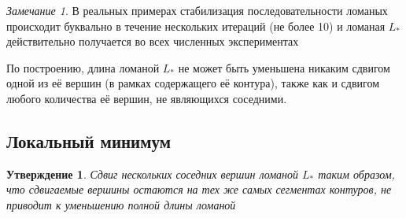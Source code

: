 \documentclass[14pt]{extarticle}
\theoremstyle{plain}%
\newtheorem{proposition}[theorem]{Утверждение}
\theoremstyle{remark}
\newtheorem{remark}{Замечание}
\begin{document}
\begin{remark}
  В реальных примерах
  стабилизация последовательности ломаных
  происходит буквально в течение
  нескольких итераций
  (не более 10)
  и ломаная
  $L_*$
  действительно получается
  во всех численных экспериментах
\end{remark}

По построению,
длина ломаной
$L_*$
не может быть уменьшена никаким сдвигом
одной из её вершин
(в рамках содержащего её контура),
также как и сдвигом
любого количества её вершин,
не являющихся соседними.

\subsection{Локальный минимум}

\begin{proposition}
  Сдвиг нескольких соседних вершин ломаной
  $L_*$
  таким образом,
  что сдвигаемые вершины остаются на тех же самых сегментах
  контуров,
  не приводит к уменьшению полной длины ломаной
\end{proposition}
\end{document}
